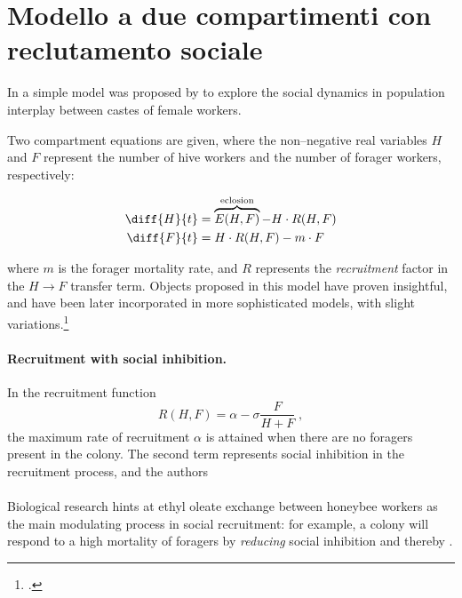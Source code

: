 \section[Modello a due compartimenti con reclutamento]{Modello a due compartimenti con reclutamento sociale}

In \citeyear{khoury2011} a simple model was proposed by \citeauthor{khoury2011} to explore the social dynamics in
population interplay between castes of female workers.

Two compartment equations are given, where the non--negative real variables $H$ and $F$ represent the number of hive workers and the number of forager workers, respectively:

\begin{align}
    \diff{H}{t} &= \overbrace{E(H,F)}^{\text{eclosion}}- H \cdot R(H,F) \label{eq:kh11h} \\
    \diff{F}{t} &= H \cdot R(H,F)  - m \cdot F \label{eq:kh11f}
\end{align}

where $m$ is the forager mortality rate, and $R$ represents the \emph{recruitment} factor in the $H \to F$ transfer term.
Objects proposed in this model have proven insightful, and have been later incorporated in more sophisticated models, with slight variations.\footcite{ratti2017}


\paragraph{Recruitment with social inhibition.}
In the recruitment function
\begin{equation}
    \label{eq:Recr}
    R(H,F) = \alpha - \sigma \frac{F}{H+F} \; ,
\end{equation}
the maximum rate of recruitment $\alpha$ is attained when there are no foragers present in the colony.
The second term represents social inhibition in the recruitment process, and the authors

\paragraph{}
Biological research hints at ethyl oleate exchange between honeybee workers as the main modulating process in social recruitment: for example, a colony will respond to a high mortality of foragers by \emph{reducing} social inhibition and thereby .

